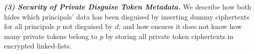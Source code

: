 \vspace{6pt}\noindent\textbf{\emph{(3) Security of Private Disguise Token Metadata.}}
We describe how \sys both hides which principals' data has
been disguised by inserting dummy  ciphertexts for all principals $p$ not disguised by $d$;
and how \sys ensures it does not know how many private tokens belong to $p$ by storing all private token
ciphertexts in encrypted linked-lists.
